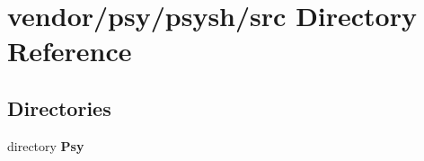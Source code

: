 \section{vendor/psy/psysh/src Directory Reference}
\label{dir_c61f6d0ef64bf76c6e8e842f0af6d703}
\subsection*{Directories}
\begin{DoxyCompactItemize}
\item 
directory {\bf Psy}
\end{DoxyCompactItemize}
